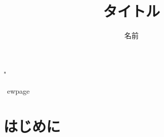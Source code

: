 "\documentclass{jsarticle}
\title{タイトル}
\author{名前} %
\begin{document}
\maketitle

\tableofcontents
\
ewpage

\section{はじめに}
\end{document}
